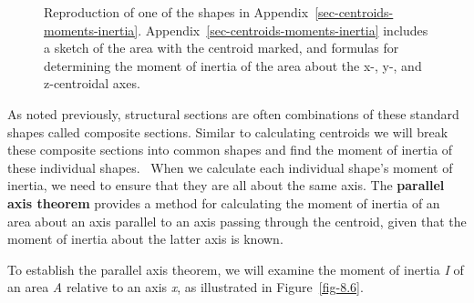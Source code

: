 \documentclass[
  letterpaper,
  DIV=11,
  numbers=noendperiod]{scrreprt}
\theoremstyle{definition}
\theoremstyle{remark}
\begin{document}
\begin{figure}


\caption{\label{fig-8.5}Reproduction of one of the shapes in
Appendix~\ref{sec-centroids-moments-inertia}.
Appendix~\ref{sec-centroids-moments-inertia} includes a sketch of the
area with the centroid marked, and formulas for determining the moment
of inertia of the area about the x-, y-, and z-centroidal axes.}

\end{figure}%

As noted previously, structural sections are often combinations of these
standard shapes called composite sections. Similar to calculating
centroids we will break these composite sections into common shapes and
find the moment of inertia of these individual shapes.~ When we
calculate each individual shape's moment of inertia, we need to ensure
that they are all about the same axis. The \textbf{parallel axis
theorem} provides a method for calculating the moment of inertia of an
area about an axis parallel to an axis passing through the centroid,
given that the moment of inertia about the latter axis is known.

To establish the parallel axis theorem, we will examine the moment of
inertia \emph{I} of an area \emph{A} relative to an axis \emph{x}, as
illustrated in Figure~\ref{fig-8.6}.
\end{document}
